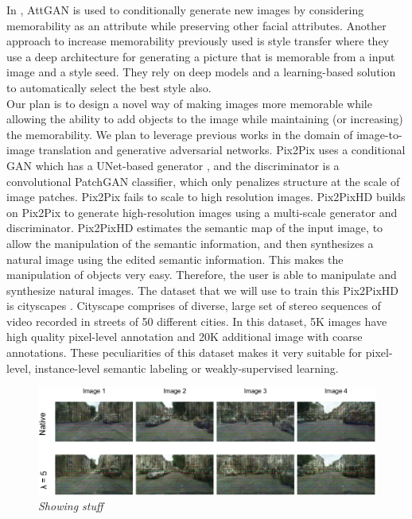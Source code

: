 \documentclass[10pt,twocolumn,letterpaper]{article}
\begin{document}
In \cite{face}, AttGAN \cite{attgan} is used to conditionally generate new images by considering memorability as an attribute while preserving other facial attributes. Another approach to increase memorability previously used is style transfer \cite{style} where they use a deep architecture for generating a picture that is memorable from a input image and a style seed. They rely on deep models and a learning-based solution to automatically select the best style also.
\\

Our plan is to design a novel way of making images more memorable while allowing the ability to add objects to the image while maintaining (or increasing) the memorability. We plan to leverage previous works in the domain of image-to-image translation and generative adversarial networks.  Pix2Pix \cite{pix2pix} uses a conditional GAN \cite{cgan} which has a UNet-based generator \cite{unet}, and the discriminator is a convolutional PatchGAN classifier, which only penalizes structure at the scale of image patches. Pix2Pix fails to scale to high resolution images. Pix2PixHD builds on Pix2Pix to generate high-resolution images using a multi-scale generator and discriminator. Pix2PixHD estimates the semantic map of the input image, to allow the manipulation of the semantic information, and then synthesizes a natural image using the edited semantic information. This makes the manipulation of objects very easy. Therefore, the user is able to manipulate and synthesize natural images. The dataset that we will use to train this Pix2PixHD is cityscapes \cite{city}. Cityscape comprises of diverse, large set of stereo sequences of video recorded in streets of 50 different cities. In this dataset, 5K images have high quality pixel-level annotation and 20K additional image with coarse annotations. These peculiarities of this dataset makes it very suitable for pixel-level, instance-level semantic labeling or weakly-supervised learning.


\begin{figure}
    \centering
    \label{pic1}
    \includegraphics[width=\linewidth]{pic1.png}
    \caption{\textit{Showing stuff}}
\end{figure}
\end{document}
